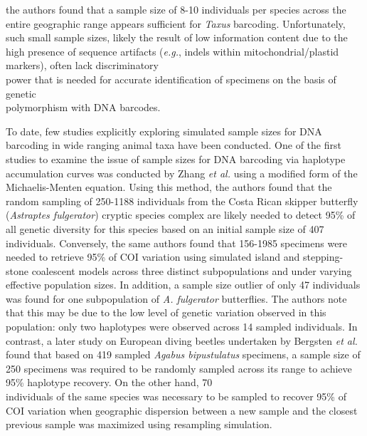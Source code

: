 the authors found that a sample size of 8-10 individuals per species across the entire geographic range appears sufficient for \textit{Taxus} barcoding. Unfortunately, such small sample sizes, likely the result of low information content due to the high presence of sequence artifacts (\textit{e.g.}, indels within mitochondrial/plastid markers), often lack discriminatory \\ power that is needed for accurate identification of specimens on the basis of genetic \\ polymorphism with DNA barcodes.

 

To date, few studies explicitly exploring simulated sample sizes for DNA barcoding in wide ranging animal taxa have been conducted. One of the first studies to examine the issue of sample sizes for DNA barcoding via haplotype accumulation curves was conducted by Zhang \textit{et al.} \cite{zhang2010estimating} using a modified form of the Michaelis-Menten equation. Using this method, the authors found that the random sampling of 250-1188 individuals from the Costa Rican skipper butterfly (\textit{Astraptes fulgerator}) cryptic species complex are likely needed to detect 95\% of all genetic diversity for this species based on an initial sample size of 407 individuals. Conversely, the same authors found that 156-1985 specimens were needed to retrieve 95\% of COI variation using simulated island \cite{wright1951genetical} and stepping-stone \cite{kimura1964stepping} coalescent models across three distinct subpopulations and under varying effective population sizes. In addition, a sample size outlier of only 47 individuals was found for one subpopulation of \textit{A. fulgerator} butterflies.  The authors note that this may be due to the low level of genetic variation observed in this population: only two haplotypes were observed across 14 sampled individuals. In contrast, a later study on European diving beetles undertaken by Bergsten \textit{et al.} \cite{bergsten2012effect} found that based on 419 sampled \textit{Agabus bipustulatus} specimens, a sample size of 250 specimens was required to be randomly sampled across its range to achieve 95\% haplotype recovery. On the other hand, 70 \\ individuals of the same species was necessary to be sampled to recover 95\% of COI variation when geographic dispersion between a new sample and the closest previous sample was maximized using resampling simulation. 



